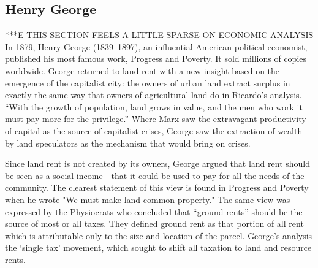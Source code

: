  
\subsection{Henry George} 
***E THIS SECTION FEELS A LITTLE SPARSE ON ECONOMIC ANALYSIS %
In 1879, Henry George (1839--1897), an influential American political economist, published his most famous work, Progress and Poverty\cite{georgeProgressPovertyInquiry1973}. It sold millions of copies worldwide. George returned to land rent with a new insight based on the emergence of the capitalist city: the owners of urban land extract surplus in exactly the same way that owners of agricultural land do in Ricardo's analysis. ``With the growth of population, land grows in value, and the men who work it must pay more for the privilege.''  Where Marx saw the extravagant productivity of capital as the source of capitalist crises, George saw the extraction of wealth by land speculators as the mechanism that would bring on crises.
  
  Since land rent is not created by its owners, George argued that land rent should be seen as a social income - that it could be used to pay for all the needs of the community. The clearest statement of this view is found in Progress and Poverty when he wrote "We must make land common property." The same view was expressed by the Physiocrats who concluded  that ``ground rents'' should be the source of most or all taxes. They defined ground rent as that portion of all rent which is attributable only to the size and location of the parcel. George's analysis the `single tax' movement, which sought to shift all taxation to land  and resource rents.   


